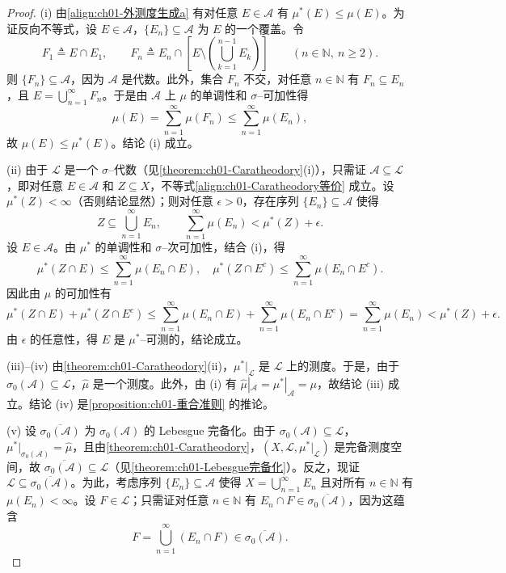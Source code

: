 \documentclass[../../main.tex]{subfiles}%
\begin{document}
\begin{proof}
(i) 由\eqref{align:ch01-外测度生成a} 有对任意 $E\in\mathcal{A}$ 有 $\mu^*(E)\leqslant\mu(E)$。为证反向不等式，设 $E\in\mathcal{A}$，$\{E_n\}\subseteq\mathcal{A}$ 为 $E$ 的一个覆盖。令
\[
F_1\triangleq E\cap E_1,\qquad F_n\triangleq E_n\cap\left[E\setminus\left(\bigcup_{k=1}^{n-1}E_k\right)\right]\qquad(n\in\mathbb{N},\ n\geqslant 2).
\]
则 $\{F_n\}\subseteq\mathcal{A}$，因为 $\mathcal{A}$ 是代数。此外，集合 $F_n$ 不交，对任意 $n\in\mathbb{N}$ 有 $F_n\subseteq E_n$，且 $E=\bigcup_{n=1}^\infty F_n$。于是由 $\mathcal{A}$ 上 $\mu$ 的单调性和 $\sigma$--可加性得
\[
\mu(E)=\sum_{n=1}^\infty\mu(F_n)\leqslant\sum_{n=1}^\infty\mu(E_n),
\]
故 $\mu(E)\leqslant\mu^*(E)$。结论 (i) 成立。

(ii) 由于 $\mathcal{L}$ 是一个 $\sigma$--代数（见\cref{theorem:ch01-Caratheodory}(i)），只需证 $\mathcal{A}\subseteq\mathcal{L}$，即对任意 $E\in\mathcal{A}$ 和 $Z\subseteq X$，不等式\eqref{align:ch01-Caratheodory等价} 成立。设 $\mu^*(Z)<\infty$（否则结论显然）；则对任意 $\epsilon>0$，存在序列 $\{E_n\}\subseteq\mathcal{A}$ 使得
\[
Z\subseteq\bigcup_{n=1}^\infty E_n,\qquad\sum_{n=1}^\infty\mu(E_n)<\mu^*(Z)+\epsilon.
\]
设 $E\in\mathcal{A}$。由 $\mu^*$ 的单调性和 $\sigma$--次可加性，结合 (i)，得
\[
\mu^*(Z\cap E)\leqslant\sum_{n=1}^\infty\mu(E_n\cap E),\quad
\mu^*(Z\cap E^c)\leqslant\sum_{n=1}^\infty\mu(E_n\cap E^c).
\]
因此由 $\mu$ 的可加性有
\[
\mu^*(Z\cap E)+\mu^*(Z\cap E^c)
\leqslant\sum_{n=1}^\infty\mu(E_n\cap E)+\sum_{n=1}^\infty\mu(E_n\cap E^c)
=\sum_{n=1}^\infty\mu(E_n)<\mu^*(Z)+\epsilon.
\]
由 $\epsilon$ 的任意性，得 $E$ 是 $\mu^*$--可测的，结论成立。

(iii)--(iv) 由\cref{theorem:ch01-Caratheodory}(ii)，$\mu^*|_{\mathcal{L}}$ 是 $\mathcal{L}$ 上的测度。于是，由于 $\sigma_0(\mathcal{A})\subseteq\mathcal{L}$，$\widehat{\mu}$ 是一个测度。此外，由 (i) 有 $\widehat{\mu}|_{\mathcal{A}}=\mu^*|_{\mathcal{A}}=\mu$，故结论 (iii) 成立。结论 (iv) 是\cref{proposition:ch01-重合准则} 的推论。

(v) 设 $\overline{\sigma_0(\mathcal{A})}$ 为 $\sigma_0(\mathcal{A})$ 的 Lebesgue 完备化。由于 $\sigma_0(\mathcal{A})\subseteq\mathcal{L}$，$\mu^*|_{\sigma_0(\mathcal{A})}=\widehat{\mu}$，且由\cref{theorem:ch01-Caratheodory}，$(X,\mathcal{L},\mu^*|_{\mathcal{L}})$ 是完备测度空间，故 $\overline{\sigma_0(\mathcal{A})}\subseteq\mathcal{L}$（见\cref{theorem:ch01-Lebesgue完备化}）。反之，现证 $\mathcal{L}\subseteq\overline{\sigma_0(\mathcal{A})}$。为此，考虑序列 $\{E_n\}\subseteq\mathcal{A}$ 使得 $X=\bigcup_{n=1}^\infty E_n$ 且对所有 $n\in\mathbb{N}$ 有 $\mu(E_n)<\infty$。设 $F\in\mathcal{L}$；只需证对任意 $n\in\mathbb{N}$ 有 $E_n\cap F\in\overline{\sigma_0(\mathcal{A})}$，因为这蕴含
\[
F=\bigcup_{n=1}^\infty(E_n\cap F)\in\overline{\sigma_0(\mathcal{A})}.
\]


\end{proof}
\end{document}
